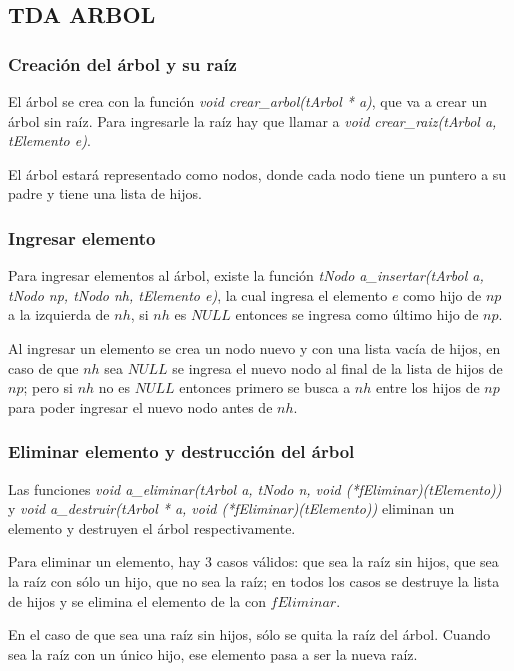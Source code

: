 \documentclass[12pt,a4paper]{article}
\begin{document}
\subsection{TDA ARBOL}
\subsubsection{Creaci\'on del \'arbol y su ra\'iz}
El \'arbol se crea con la funci\'on \emph{void crear\_arbol(tArbol * a)}, que va a crear un \'arbol sin ra\'iz. Para ingresarle la ra\'iz hay que llamar a \emph{void crear\_raiz(tArbol a, tElemento e)}.

El \'arbol estar\'a representado como nodos, donde cada nodo tiene un puntero a su padre y tiene una lista de hijos.

\subsubsection{Ingresar elemento}
Para ingresar elementos al \'arbol, existe la funci\'on \emph{tNodo a\_insertar(tArbol a, tNodo np, tNodo nh, tElemento e)}, la cual ingresa el elemento $e$ como hijo de $np$ a la izquierda de $nh$, si $nh$ es $NULL$ entonces se ingresa como \'ultimo hijo de $np$.

Al ingresar un elemento se crea un nodo nuevo y con una lista vac\'ia de hijos, en caso de que $nh$ sea $NULL$ se ingresa el nuevo nodo al final de la lista de hijos de $np$; pero si $nh$ no es $NULL$ entonces primero se busca a $nh$ entre los hijos de $np$ para poder ingresar el nuevo nodo antes de $nh$.

\subsubsection{Eliminar elemento y destrucci\'on del \'arbol}
Las funciones \emph{void a\_eliminar(tArbol a, tNodo n, void (*fEliminar)(tElemento))} y \emph{void a\_destruir(tArbol * a, void (*fEliminar)(tElemento))} eliminan un elemento y destruyen el \'arbol respectivamente.

Para eliminar un elemento, hay 3 casos v\'alidos: que sea la ra\'iz sin hijos, que sea la ra\'iz con s\'olo un hijo, que no sea la ra\'iz; en todos los casos se destruye la lista de hijos y se elimina el elemento de la con $fEliminar$.

En el caso de que sea una ra\'iz sin hijos, s\'olo se quita la ra\'iz del \'arbol. Cuando sea la ra\'iz con un \'unico hijo, ese elemento pasa a ser la nueva ra\'iz.
\end{document}
